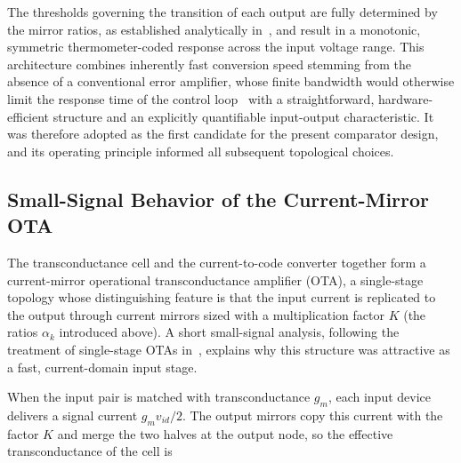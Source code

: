 
The thresholds governing the transition of each output are fully determined by
the mirror ratios, as established analytically in~\cite{lee2017}, and result
in a monotonic, symmetric thermometer-coded response across the input voltage
range. This architecture combines inherently fast conversion speed stemming
from the absence of a conventional error amplifier, whose finite bandwidth
would otherwise limit the response time of the control
loop~\cite{lee2017} with a straightforward, hardware-efficient structure and
an explicitly quantifiable input-output characteristic. It was therefore
adopted as the first candidate for the present comparator design, and its
operating principle informed all subsequent topological choices.

\subsection{Small-Signal Behavior of the Current-Mirror OTA}
\label{subsec:cm_ota_analysis}

The transconductance cell and the current-to-code converter together form a
current-mirror operational transconductance amplifier (OTA), a single-stage topology whose distinguishing feature is
that the input current is replicated to the output through current mirrors
sized with a multiplication factor $K$ (the ratios $\alpha_k$ introduced
above). A short small-signal analysis, following the treatment of single-stage
OTAs in~\cite{choi2023}, explains why this structure was attractive as a fast,
current-domain input stage.

When the input pair is matched with transconductance $g_m$, each input device
delivers a signal current $g_m v_{id}/2$. The output mirrors copy this current
with the factor $K$ and merge the two halves at the output node, so the
effective transconductance of the cell is

